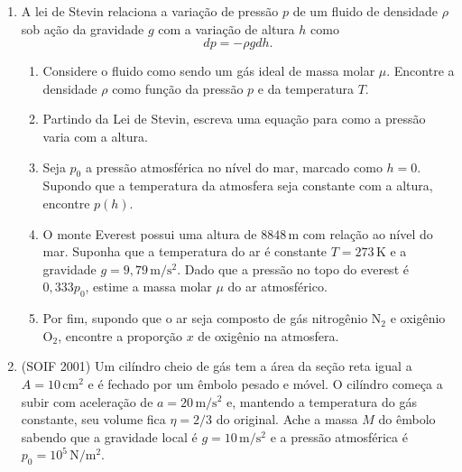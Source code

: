 \begin{enumerate}
    \item
        A lei de Stevin relaciona a variação de pressão $p$ de um fluido de
        densidade $\rho$ sob ação da gravidade $g$ com a variação de altura
        $h$ como
        $$dp=-\rho gdh.$$
        \begin{enumerate}
            \item 
                Considere o fluido como sendo um gás ideal de massa molar
                $\mu$. Encontre a densidade $\rho$ como função da pressão $p$ e
                da temperatura $T$.
            \item
                Partindo da Lei de Stevin, escreva uma equação para como a
                pressão varia com a altura.
            \item 
                Seja $p_0$ a pressão atmosférica no nível do mar, marcado como
                $h=0$. Supondo que a temperatura da atmosfera seja constante com
                a altura, encontre $p(h)$.
            \item 
                O monte Everest possui uma altura de $8848\,\mathrm{m}$ com
                relação ao nível do mar. Suponha que a temperatura do ar é
                constante $T=273\,\mathrm{K}$ e a gravidade $g=9{,}79
                \,\mathrm{m/s^2}$. Dado que a pressão no topo do everest é
                $0{,}333p_0$, estime a massa molar $\mu$ do ar atmosférico.
            \item 
                Por fim, supondo que o ar seja composto de gás nitrogênio 
                $\mathrm{N_2}$ e oxigênio $\mathrm{O_2}$, encontre a proporção
                $x$ de oxigênio na atmosfera.
        \end{enumerate}

    \item
        (SOIF 2001) Um cilíndro cheio de gás tem a área da seção reta igual a
        $A=10\,\mathrm{cm^2}$ e é fechado por um êmbolo pesado e móvel. O
        cilíndro começa a subir com aceleração de $a=20\,\mathrm{m/s^2}$ e,
        mantendo a temperatura do gás constante, seu volume fica $\eta=2/3$ do
        original. Ache a massa $M$ do êmbolo sabendo que a gravidade local é $g=
        10\,\mathrm{m/s^2}$ e a pressão atmosférica é $p_0=10^5
        \,\mathrm{N/m^2}$. 


\end{enumerate}
